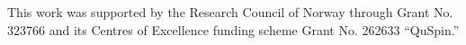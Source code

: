 \documentclass[aps,twocolumn,amsmath,amssymb,preprintnumbers,floatfix,prl,superscriptaddress,longbibliography]{revtex4-2}%
\begin{document}

\acknowledgments

 

This work was supported by the Research
Council of Norway through Grant No. 323766 and its Centres
of Excellence funding scheme Grant No. 262633 “QuSpin.”
\end{document}
